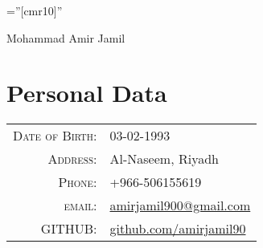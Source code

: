 \documentclass[a4paper,10pt]{article}
\begin{document}
\pagestyle{empty} %

\font\fb=''[cmr10]'' %

\par{\centering
		{\Huge Mohammad Amir Jamil}
	}\bigskip\par

\section{Personal Data}

\begin{tabular}{rl}
    \textsc{Date of Birth:} &  03-02-1993 \\
    \textsc{Address:}   & Al-Naseem, Riyadh \\
    \textsc{Phone:}     & +966-506155619\\
    \textsc{email:}     & \href{mailto:amirjamil900@gmail.com}{amirjamil900@gmail.com}\\
   \textsc{GITHUB:}    &   \href{https://github.com/amirjamil90}{github.com/amirjamil90}
\end{tabular}

\end{document}

